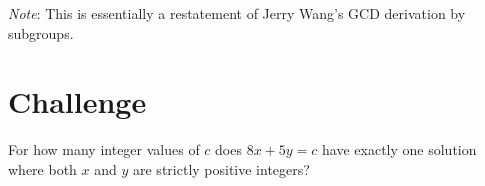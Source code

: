 \emph{Note}: This is essentially a restatement of Jerry Wang's GCD derivation by subgroups.


\section{Challenge}

\begin{challenge}
  For how many integer values of $c$ does $8x+5y=c$ have exactly one solution
  where both $x$ and $y$ are strictly positive integers?
\end{challenge}
